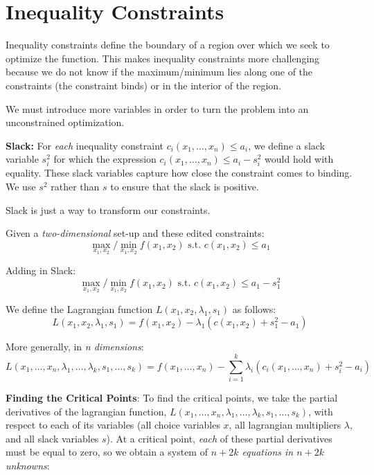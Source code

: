 \documentclass[]{book}
\theoremstyle{definition}
\theoremstyle{definition}
\theoremstyle{definition}
\theoremstyle{remark}
\begin{document}
\section{Inequality Constraints}\label{inequality-constraints}

Inequality constraints define the boundary of a region over which we
seek to optimize the function. This makes inequality constraints more
challenging because we do not know if the maximum/minimum lies along one
of the constraints (the constraint binds) or in the interior of the
region.

We must introduce more variables in order to turn the problem into an
unconstrained optimization.

\textbf{Slack:} For \textit{each} inequality constraint
\(c_i(x_1, \dots, x_n) \leq a_i\), we define a slack variable \(s_i^2\)
for which the expression \(c_i(x_1, \dots, x_n) \leq a_i - s_i^2\) would
hold with equality. These slack variables capture how close the
constraint comes to binding. We use \(s^2\) rather than \(s\) to ensure
that the slack is positive.

Slack is just a way to transform our constraints.

Given a \textit{two-dimensional} set-up and these edited constraints:
\[\max_{x_1,x_2}/\min_{x_1,x_2} f(x_1,x_2) \text{ s.t. } c(x_1,x_2) \le a_1\]

Adding in Slack:
\[\max_{x_1,x_2}/\min_{x_1,x_2} f(x_1,x_2) \text{ s.t. } c(x_1,x_2) \le a_1 - s_1^2\]

We define the Lagrangian function \(L(x_1,x_2,\lambda_1,s_1)\) as
follows:
\[L(x_1,x_2,\lambda_1,s_1) = f(x_1,x_2) - \lambda_1 ( c(x_1,x_2) + s_1^2 - a_1)\]

More generally, in \textit{n dimensions}:
\[ L(x_1, \dots, x_n, \lambda_1, \dots, \lambda_k, s_1, \dots, s_k) = f(x_1, \dots, x_n) - \sum_{i = 1}^k \lambda_i(c_i(x_1,\dots, x_n) + s_i^2 - a_i)\]

\textbf{Finding the Critical Points}: To find the critical points, we
take the partial derivatives of the lagrangian function,
\(L(x_1,\dots,x_n,\lambda_1,\dots,\lambda_k,s_1,\dots,s_k)\), with
respect to each of its variables (all choice variables \(x\), all
lagrangian multipliers \(\lambda\), and all slack variables \(s\)). At a
critical point, \textit{each} of these partial derivatives must be equal
to zero, so we obtain a system of
\textit{$n + 2k$ equations in $n + 2k$ unknowns}:
\end{document}
